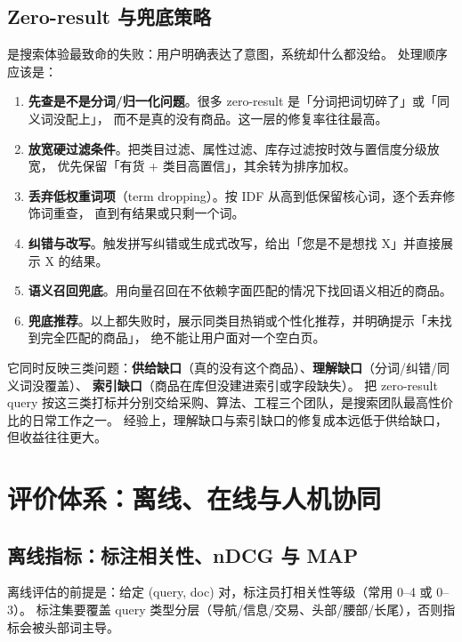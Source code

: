 \subsection{Zero-result 与兜底策略}

 是搜索体验最致命的失败：用户明确表达了意图，系统却什么都没给。
处理顺序应该是：

\begin{enumerate}
  \item \textbf{先查是不是分词/归一化问题}。很多 zero-result 是「分词把词切碎了」或「同义词没配上」，
        而不是真的没有商品。这一层的修复率往往最高。
  \item \textbf{放宽硬过滤条件}。把类目过滤、属性过滤、库存过滤按时效与置信度分级放宽，
        优先保留「有货 + 类目高置信」，其余转为排序加权。
  \item \textbf{丢弃低权重词项}（term dropping）。按 IDF 从高到低保留核心词，逐个丢弃修饰词重查，
        直到有结果或只剩一个词。
  \item \textbf{纠错与改写}。触发拼写纠错或生成式改写，给出「您是不是想找 X」并直接展示 X 的结果。
  \item \textbf{语义召回兜底}。用向量召回在不依赖字面匹配的情况下找回语义相近的商品。
  \item \textbf{兜底推荐}。以上都失败时，展示同类目热销或个性化推荐，并明确提示「未找到完全匹配的商品」，
        绝不能让用户面对一个空白页。
\end{enumerate}

\begin{insight}
它同时反映三类问题：\textbf{供给缺口}（真的没有这个商品）、\textbf{理解缺口}（分词/纠错/同义词没覆盖）、
\textbf{索引缺口}（商品在库但没建进索引或字段缺失）。
把 zero-result query 按这三类打标并分别交给采购、算法、工程三个团队，是搜索团队最高性价比的日常工作之一。
经验上，理解缺口与索引缺口的修复成本远低于供给缺口，但收益往往更大。
\end{insight}

\section{评价体系：离线、在线与人机协同}
\label{sec:search-eval}

\subsection{离线指标：标注相关性、nDCG 与 MAP}

离线评估的前提是：给定 (query, doc) 对，标注员打相关性等级（常用 0--4 或 0--3）。
标注集要覆盖 query 类型分层（导航/信息/交易、头部/腰部/长尾），否则指标会被头部词主导。


